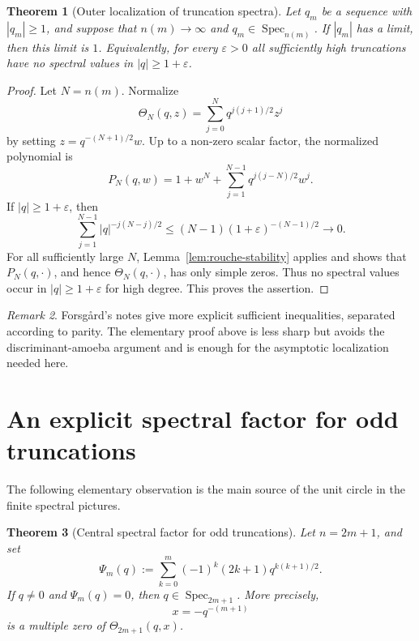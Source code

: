 \documentclass[11pt,a4paper,reqno]{amsart}
\newtheorem{theorem}{Theorem}[section]
\theoremstyle{remark}
\newtheorem{remark}[theorem]{Remark}
\newcommand{\Spec}{\operatorname{Spec}}
\begin{document}
\begin{theorem}[Outer localization of truncation spectra]\label{thm:outer-localization}
Let \(q_m\) be a sequence with \(|q_m|\ge1\), and suppose that \(n(m)\to\infty\) and \(q_m\in\Spec_{n(m)}\).  If \(|q_m|\) has a limit, then this limit is \(1\).  Equivalently, for every \(\varepsilon>0\) all sufficiently high truncations have no spectral values in \(|q|\ge1+\varepsilon\).
\end{theorem}

\begin{proof}
Let \(N=n(m)\).  Normalize
\[
        \Theta_N(q,z)=\sum_{j=0}^Nq^{j(j+1)/2}z^j
\]
by setting \(z=q^{-(N+1)/2}w\).  Up to a non-zero scalar factor, the normalized polynomial is
\[
        P_N(q,w)=1+w^N+
        \sum_{j=1}^{N-1}q^{j(j-N)/2}w^j.
\]
If \(|q|\ge1+\varepsilon\), then
\[
        \sum_{j=1}^{N-1}|q|^{-j(N-j)/2}
        \le (N-1)(1+\varepsilon)^{-(N-1)/2}\longrightarrow0.
\]
For all sufficiently large \(N\), Lemma~\ref{lem:rouche-stability} applies and shows that \(P_N(q,\cdot)\), and hence \(\Theta_N(q,\cdot)\), has only simple zeros.  Thus no spectral values occur in \(|q|\ge1+\varepsilon\) for high degree.  This proves the assertion.
\end{proof}

\begin{remark}
Forsg\aa rd's notes \cite{ForsgardNotes} give more explicit sufficient inequalities, separated according to parity.  The elementary proof above is less sharp but avoids the discriminant-amoeba argument and is enough for the asymptotic localization needed here.
\end{remark}

\section{An explicit spectral factor for odd truncations}
The following elementary observation is the main source of the unit circle in the finite spectral pictures.

\begin{theorem}[Central spectral factor for odd truncations]\label{thm:central-factor}
Let \(n=2m+1\), and set
\[
        \Psi_m(q):=\sum_{k=0}^{m}(-1)^k(2k+1)q^{k(k+1)/2}.
\]
If \(q\ne0\) and \(\Psi_m(q)=0\), then \(q\in\Spec_{2m+1}\).  More precisely,
\[
        x=-q^{-(m+1)}
\]
is a multiple zero of \(\Theta_{2m+1}(q,x)\).
\end{theorem}
\end{document}
